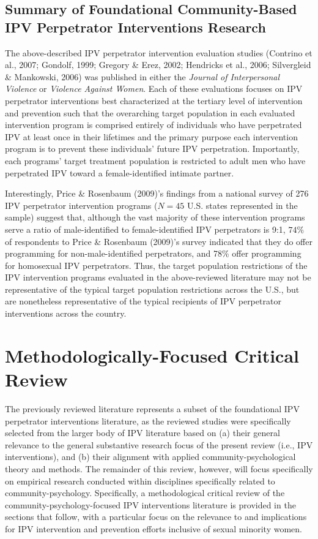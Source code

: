 \documentclass[11pt,]{tufte-book}
\begin{document}
\section{Summary of Foundational Community-Based IPV Perpetrator
Interventions
Research}\label{summary-of-foundational-community-based-ipv-perpetrator-interventions-research}

The above-described IPV perpetrator intervention evaluation studies
(Contrino et al., 2007; Gondolf, 1999; Gregory \& Erez, 2002; Hendricks
et al., 2006; Silvergleid \& Mankowski, 2006) was published in either
the \emph{Journal of Interpersonal Violence} or \emph{Violence Against
Women}. Each of these evaluations focuses on IPV perpetrator
interventions best characterized at the tertiary level of intervention
and prevention such that the overarching target population in each
evaluated intervention program is comprised entirely of individuals who
have perpetrated IPV at least once in their lifetimes and the primary
purpose each intervention program is to prevent these individuals'
future IPV perpetration. Importantly, each programs' target treatment
population is restricted to adult men who have perpetrated IPV toward a
female-identified intimate partner.

Interestingly, Price \& Rosenbaum (2009)'s findings from a national
survey of 276 IPV perpetrator intervention programs (\(N = 45\) U.S.
states represented in the sample) suggest that, although the vast
majority of these intervention programs serve a ratio of male-identified
to female-identified IPV perpetrators is 9:1, \(74\%\) of respondents to
Price \& Rosenbaum (2009)'s survey indicated that they do offer
programming for non-male-identified perpetrators, and 78\% offer
programming for homosexual IPV perpetrators. Thus, the target population
restrictions of the IPV intervention programs evaluated in the
above-reviewed literature may not be representative of the typical
target population restrictions across the U.S., but are nonetheless
representative of the typical recipients of IPV perpetrator
interventions across the country.

\chapter{Methodologically-Focused Critical
Review}\label{methodologically-focused-critical-review}

The previously reviewed literature represents a subset of the
foundational IPV perpetrator interventions literature, as the reviewed
studies were specifically selected from the larger body of IPV
literature based on (a) their general relevance to the general
substantive research focus of the present review (i.e., IPV
interventions), and (b) their alignment with applied
community-psychological theory and methods. The remainder of this
review, however, will focus specifically on empirical research conducted
within disciplines specifically related to community-psychology.
Specifically, a methodological critical review of the
community-psychology-focused IPV interventions literature is provided in
the sections that follow, with a particular focus on the relevance to
and implications for IPV intervention and prevention efforts inclusive
of sexual minority women.
\end{document}
